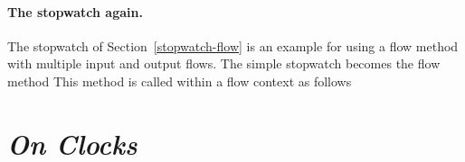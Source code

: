 
\paragraph{The stopwatch again.}
The stopwatch of Section~\ref{stopwatch-flow} is an example for using a flow method with multiple input and output flows. The simple stopwatch becomes the flow method
%
%
This method is called within a flow context as follows
%
%




\section{\textit{On Clocks}}\label{multi-clock}

